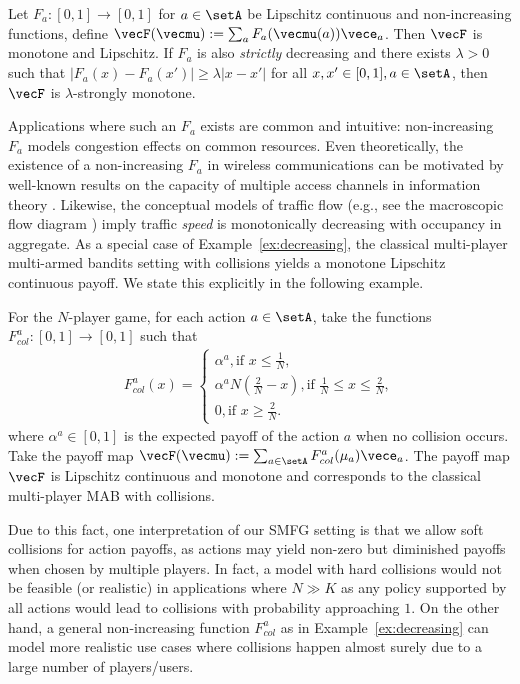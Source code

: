 \begin{example}\label{ex:decreasing}
Let $F_a:[0,1] \rightarrow [0,1]$ for $a\in\setA$ be Lipschitz continuous and non-increasing functions, define $\vecF(\vecmu) := \sum_a F_a(\vecmu(a)) \vece_a$.
Then $\vecF$ is monotone and Lipschitz.
If $F_a$ is also \emph{strictly} decreasing and there exists $\lambda > 0$ such that $|F_a(x) - F_a(x')| \geq \lambda |x-x'|$ for all $x,x'\in[0,1], a \in \setA$, then $\vecF$ is $\lambda$-strongly monotone.
\end{example}
Applications where such an $F_a$ exists are common and intuitive: non-increasing $F_a$ models congestion effects on common resources.
Even theoretically, the existence of a non-increasing $F_a$ in wireless communications can be motivated by well-known results on the capacity of multiple access channels in information theory \citep{el1980multiple, skwirzynski1981new}.
Likewise, the conceptual models of traffic flow (e.g., see the macroscopic flow diagram \citep{loder2019understanding}) imply traffic \emph{speed} is monotonically decreasing with occupancy in aggregate.
As a special case of Example~\ref{ex:decreasing}, the classical multi-player multi-armed bandits setting with collisions yields a monotone Lipschitz continuous payoff.
We state this explicitly in the following example. 

\begin{example}
For the $N$-player game, for each action $a\in\setA$, take the functions $F_{col}^a: [0,1] \rightarrow [0,1]$ such that
\begin{align*}
    F_{col}^a(x) = \begin{cases}
        \alpha^a , \text{if } x \leq \frac{1}{N}, \\
        \alpha^a N (\frac{2}{N} - x), \text{if } \frac{1}{N} \leq x \leq \frac{2}{N}, \\
        0, \text{if } x \geq \frac{2}{N}.
    \end{cases}
\end{align*}
where $\alpha^a \in [0,1]$ is the expected payoff of the action $a$ when no collision occurs.
Take the payoff map $\vecF(\vecmu) := \sum_{a\in\setA} F_{col}^a(\mu_a) \vece_a$.
The payoff map $\vecF$ is Lipschitz continuous and monotone and corresponds to the classical multi-player MAB with collisions. 

Due to this fact, one interpretation of our SMFG setting is that we allow soft collisions for action payoffs, as actions may yield non-zero but diminished payoffs when chosen by multiple players.
In fact, a model with hard collisions would not be feasible (or realistic) in applications where $N \gg K$ as any policy supported by all actions would lead to collisions with probability approaching $1$.
On the other hand, a general non-increasing function $F_{col}^a$ as in Example~\ref{ex:decreasing} can model more realistic use cases where collisions happen almost surely due to a large number of players/users.
\end{example}










